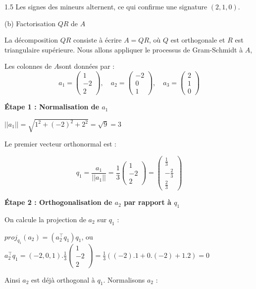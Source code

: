 \documentclass[12pt]{article}
\begin{document}
\begin{spacing}{1.5}
Les signes des mineurs alternent, ce qui confirme une signature $(2, 1, 0)$.

(b) Factorisation $QR$ de $A$

La décomposition $QR$ consiste à écrire $A = QR$, où $Q$ est orthogonale et $R$ est triangulaire supérieure. Nous allons appliquer le processus de Gram-Schmidt à $A$, 

Les colonnes de $A$sont données par :\\
\[
a_1=\begin{pmatrix}
1\\
-2\\
2
\end{pmatrix}, \quad a_2=\begin{pmatrix}
-2\\
0\\
1
\end{pmatrix}, \quad a_3=\begin{pmatrix}
2\\
1\\
0
\end{pmatrix}
\]

\textbf{Étape 1 : Normalisation de $a_1$}

$\vert\vert a_1\vert\vert=\sqrt{1^2+(-2)^2+2^2}=\sqrt{9}=3$

Le premier vecteur orthonormal est :

\[q_1=\frac{a_1}{\vert\vert a_1\vert\vert}=\frac{1}{3}\begin{pmatrix}
1\\
-2\\
2
\end{pmatrix}=\begin{pmatrix}
\frac{1}{3}\\
-\frac{2}{3}\\
\frac{2}{3}
\end{pmatrix}\]

\medskip
\textbf{Étape 2 : Orthogonalisation de $a_2$ par rapport à $q_1$}

On calcule la projection de $a_2$ sur $q_1$ :

$proj_{q_1}(a_2)=(a_2^{\intercal}q_1)q_1$, ou $a_2^{\intercal}q_1=(-2, 0,1).\frac{1}{3}\begin{pmatrix}
1\\
-2\\
2
\end{pmatrix}=\frac{1}{3}((-2).1+0.(-2)+1.2)=0$

Ainsi $a_2$ est déjà orthogonal à $q_1$. Normalisons $a_2$ :


\end{spacing}
\end{document}
